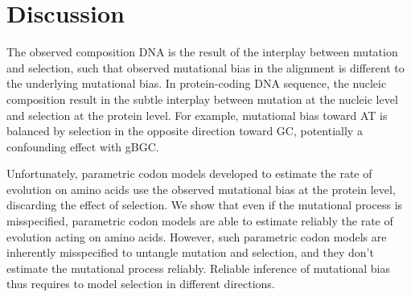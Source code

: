 \begin{table}[H]
    \centering
    \noindent{}
    \caption[Estimated parameters]{
    Nucleoprotein alignment of 498 amino acids available for 180 species (left column).
    Lactamase alignment of 263 amino acids available for 85 species (right column).
    }
    \label{table-mut-bias:estimation}
\end{table}


\section{Discussion}

The observed composition DNA is the result of the interplay between mutation and selection, such that observed mutational bias in the alignment is different to the underlying mutational bias.
In protein-coding DNA sequence, the nucleic composition result in the subtle interplay between mutation at the nucleic level and selection at the protein level.
For example, mutational bias toward AT is balanced by selection in the opposite direction toward GC, potentially a confounding effect with gBGC.

Unfortunately, parametric codon models developed to estimate the rate of evolution on amino acids use the observed mutational bias at the protein level, discarding the effect of selection.
We show that even if the mutational process is misspecified, parametric codon models are able to estimate reliably the rate of evolution acting on amino acids.
However, such parametric codon models are inherently misspecified to untangle mutation and selection, and they don't estimate the mutational process reliably.
Reliable inference of mutational bias thus requires to model selection in different directions.

